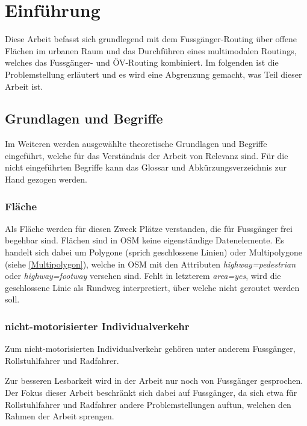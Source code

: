 \section{Einführung}
\label{Einführung}
Diese Arbeit befasst sich grundlegend mit dem Fussgänger-Routing über offene Flächen im urbanen Raum und das Durchführen eines multimodalen Routings, welches das Fussgänger- und ÖV-Routing kombiniert. Im folgenden ist die Problemstellung erläutert und es wird eine Abgrenzung gemacht, was Teil dieser Arbeit ist.

\subsection{Grundlagen und Begriffe}
\label{Grundlagen und Begriffe}

Im Weiteren werden ausgewählte theoretische Grundlagen und Begriffe eingeführt, welche für das Verständnis der Arbeit von Relevanz sind. Für die nicht eingeführten Begriffe kann das Glossar und Abkürzungsverzeichnis zur Hand gezogen werden.

\subsubsection{Fläche}
\label{Fläche}

Als Fläche werden für diesen Zweck Plätze verstanden, die für Fussgänger frei begehbar sind. Flächen sind in \ac{OSM} keine eigenständige Datenelemente. Es handelt sich dabei um Polygone (sprich geschlossene Linien) oder Multipolygone (siehe \ref{Multipolygon}), welche in \ac{OSM} mit den Attributen \textit{highway=pedestrian} oder \textit{highway=footway} versehen sind. Fehlt in letzterem \textit{area=yes}, wird die geschlossene Linie als Rundweg interpretiert, über welche nicht geroutet werden soll. \cite{osm_wiki_area}

\subsubsection{nicht-motorisierter Individualverkehr}
\label{nicht-motorisierter Individualverkehr}

Zum nicht-motorisierten Individualverkehr gehören unter anderem Fussgänger, Rollstuhlfahrer und Radfahrer.

Zur besseren Lesbarkeit wird in der Arbeit nur noch von Fussgänger gesprochen. Der Fokus dieser Arbeit beschränkt sich dabei auf Fussgänger, da sich etwa für Rollstuhlfahrer und Radfahrer andere Problemstellungen auftun, welchen den Rahmen der Arbeit sprengen. 

